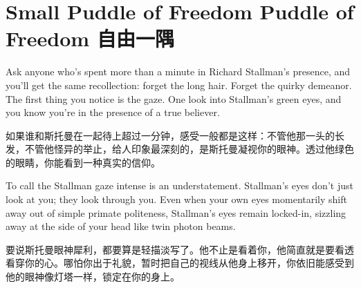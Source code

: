 \chapter{\ifdefined\eng
\ifdefined\vone 
Small Puddle of Freedom
\fi
\ifdefined\vtwo
Puddle of Freedom
\fi
\fi
\ifdefined\chs
自由一隅
\fi}
\thispagestyle{empty}
\ifdefined\eng
\ifdefined{}
\fi
\fi

\ifdefined\chs
\ifdefined{}
\fi
\fi

\ifdefined\eng
Ask anyone who's spent more than a minute in Richard Stallman's presence, and you'll get the same recollection: forget the long hair. Forget the quirky demeanor. The first thing you notice is the gaze. One look into Stallman's green eyes, and you know you're in the presence of a true believer.
\fi

\ifdefined\chs
如果谁和斯托曼在一起待上超过一分钟，感受一般都是这样：不管他那一头的长发，不管他怪异的举止，给人印象最深刻的，是斯托曼凝视你的眼神。透过他绿色的眼睛，你能看到一种真实的信仰。
\fi

\ifdefined\eng
To call the Stallman gaze intense is an understatement. Stallman's eyes don't just look at you; they look through you. Even when your own eyes momentarily shift away out of simple primate politeness, Stallman's eyes remain locked-in, sizzling away at the side of your head like twin photon beams.
\fi

\ifdefined\chs
要说斯托曼眼神犀利，都要算是轻描淡写了。他不止是看着你，他简直就是要看透看穿你的心。哪怕你出于礼貌，暂时把自己的视线从他身上移开，你依旧能感受到他的眼神像灯塔一样，锁定在你的身上。
\fi


